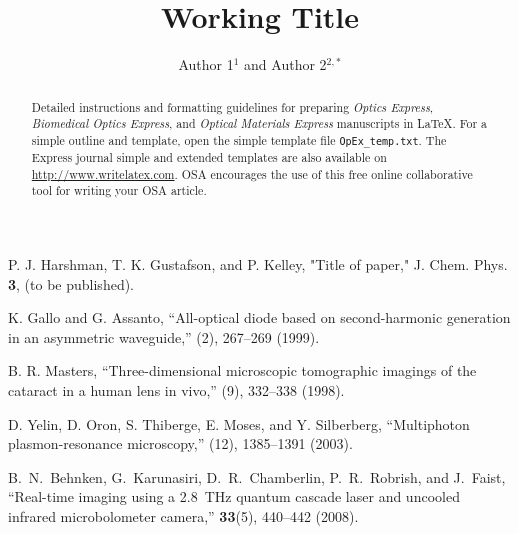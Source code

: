 \documentclass[10pt,letterpaper]{article}
\begin{document}
\title{Working Title}
\author{Author 1$^1$ and Author 2$^{2,*}$}

\address{$^1$Department of Physics and Astronomy, University of Pennsylvania, Philadelphia, PA 19104, USA\\
$^2$Department of Computer Science, University College London, London, UK}




\begin{abstract}
Detailed instructions and formatting guidelines for preparing \textit{Optics Express}, \textit{Biomedical Optics Express}, and \textit{Optical Materials Express} manuscripts in \LaTeX. For a simple outline and template, open the simple template file \texttt{OpEx\_temp.txt}. The Express journal simple and extended templates are also available on \url{http://www.writelatex.com}. OSA encourages the use of this free online collaborative tool for writing your OSA article.
\end{abstract}


\begin{thebibliography}{99}
P. J. Harshman, T. K. Gustafson, and P. Kelley, "Title of paper," J. Chem. Phys. {\bf 3}, (to be published).

 K. Gallo and G. Assanto, ``All-optical diode based on second-harmonic generation in an asymmetric waveguide,'' (2), 267--269 (1999).

 B. R. Masters, ``Three-dimensional microscopic tomographic imagings of the cataract in a human lens in vivo,'' (9), 332--338 (1998).

 D. Yelin,  D. Oron,  S. Thiberge,  E. Moses, and Y. Silberberg, ``Multiphoton plasmon-resonance microscopy,'' (12), 1385--1391 (2003).

B.~N.~Behnken, G.~Karunasiri, D.~R.~Chamberlin, P.~R.~Robrish, and J.~Faist,
``Real-time imaging using a 2.8~THz quantum cascade laser and uncooled infrared microbolometer camera,''
\ol \textbf{33}(5), 440--442 (2008).

\end{thebibliography}
\end{document}
